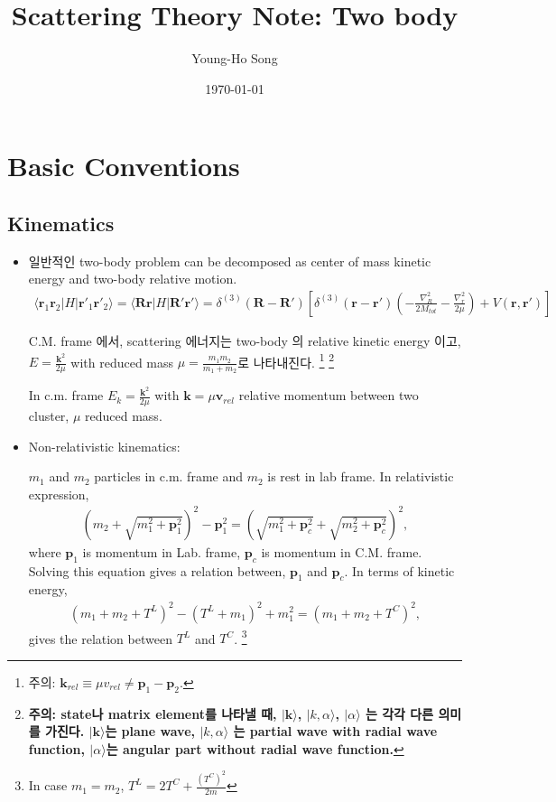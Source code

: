 \documentclass[10pt]{book}
\title{Scattering Theory Note: Two body}
\author{Young-Ho Song}
\date{\today}
\def\bm{\boldsymbol}
\newcommand{\bea}{\begin{eqnarray}}
\newcommand{\eea}{\end{eqnarray}}
\def\vp{{\bm p}}
\def\vk{{\bm k}}
\def\vr{{\bm r}}
\def\vR{{\bm R}}
\def\la{\langle}
\def\ra{\rangle}
\begin{document}
\maketitle
\tableofcontents
\newpage

\chapter{Basic Conventions}

\section{Kinematics}
\label{sec:1}
\begin{itemize}
\item 일반적인 two-body problem can be decomposed as 
center of mass kinetic energy and two-body relative 
motion.
\bea
\la \vr_1 \vr_2|H|\vr'_1\vr'_2\ra
=\la \vR \vr|H|\vR' \vr'\ra
=\delta^{(3)}(\vR-\vR')
 \left[
 \delta^{(3)}(\vr-\vr')\left(-\frac{\nabla^2_R}{2M_{tot}}
                       -\frac{\nabla_r^2}{2\mu}\right)
 +V(\vr,\vr')\right]                      
\eea

C.M. frame 에서,
scattering 에너지는 two-body 의 relative kinetic energy 이고,
$E=\frac{\vk^2}{2\mu}$ with reduced mass 
$\mu=\frac{m_1m_2}{m_1+m_2}$로 나타내진다. 
\footnote{
주의: $\vk_{rel}\equiv \mu v_{rel} \neq \vp_1-\vp_2$.}
\footnote{
{\bf 주의: state나 matrix element를 나타낼 때,
$|\vk\ra$, $|k, \alpha\ra$, $|\alpha\ra$ 는 각각
다른 의미를 가진다. $|\vk\ra$는 plane wave, $|k,\alpha\ra$ 는
partial wave with radial wave function, $|\alpha\ra$는 
angular part without radial wave function.}
}

In c.m. frame $E_k=\frac{\vk^2}{2\mu}$
with $\vk=\mu {\bm v}_{rel}$ relative momentum
between two cluster, $\mu$ reduced mass.

\item Non-relativistic kinematics: 

$m_1$ and $m_2$ particles in c.m. frame and
$m_2$ is rest in lab frame.
In relativistic expression,
\bea
(m_2+\sqrt{m_1^2+\vp_1^2})^2-\vp_1^2 
       =(\sqrt{m_1^2+\vp_c^2}+\sqrt{m_2^2+\vp_c^2})^2,
\eea
where $\vp_{1}$ is momentum in Lab. frame, $\vp_c$ is momentum in
C.M. frame. Solving this equation gives a relation between,
$\vp_1$ and $\vp_c$. In terms of kinetic energy,
\bea
(m_1+m_2+T^L)^2-(T^L+m_1)^2+m_1^2
=(m_1+m_2+T^C)^2,
\eea
gives the relation between $T^L$ and $T^C$.
\footnote{In case $m_1=m_2$, $T^L=2 T^C+\frac{(T^{C})^2}{2m}$}


\end{itemize}
\end{document}
